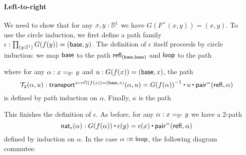 \documentclass[
%
%
11pt %
]{article}
\newcommand{\nathom}[2]{\mathsf{nat}_{#1}(#2)}
\newcommand{\T}[2]{\mathcal{T}_2(#1,#2)}
\newcommand{\I}{\mathcal{I}_1}
\begin{document}
\paragraph*{Left-to-right}
We need to show that for any $x,y : \mathbb{S}^1$ we have $G(F^\times(x,y)) = (x,y)$. To use the circle induction, we first define a path family $\epsilon : \prd{y:\Sn^1} G(f(y)) = (\base,y)$. The definition of $\epsilon$ itself proceeds by circle induction: we map $\mathsf{base}$ to the path $\mathsf{refl}_{(\mathsf{base},\mathsf{base})}$ and $\mathsf{loop}$ to the path
\begin{center}
\end{center}
where for any $\alpha : x =_{\mathbb{S}^1} y$ and $u : G(f(x)) = (\mathsf{base},x)$, the path \[\T{\alpha}{u} : \transfib{z \mapsto G(f(z)) = (\base,z)}{\alpha}{u} = \opp{\ap{G}{\ap{f}{\alpha}}} \ct u \ct \pairpath(\refl{},\alpha) \]
is defined by path induction on $\alpha$. Finally, $\kappa$ is the path
\begin{center}
\end{center}
This finishes the definition of $\epsilon$. As before, for any $\alpha : x =_{\mathbb{S}^1} y$ we have a 2-path \[\nathom{\epsilon}{\alpha} : \ap{G}{\ap{f}{\alpha}} \ct \epsilon(y) = \epsilon(x) \ct \pairpath(\refl{},\alpha)\] defined by induction on $\alpha$. In the case $\alpha \vcentcolon\equiv \mathsf{loop}$, the following diagram commutes:
\begin{center}
\end{center}
\end{document}

